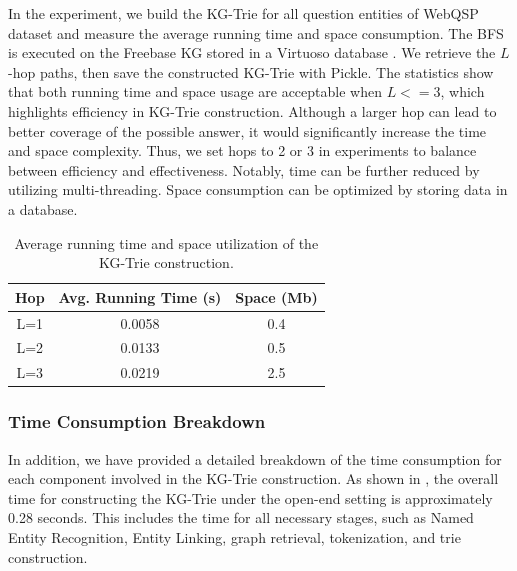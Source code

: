 {    In the experiment, we build the KG-Trie for all question entities of WebQSP dataset and measure the average running time and space consumption. The BFS is executed on the Freebase KG stored in a Virtuoso database \citep{erling2009rdf}. We retrieve the $L$-hop paths, then save the constructed KG-Trie with Pickle. The statistics show that both running time and space usage are acceptable when $L<=3$, which highlights efficiency in KG-Trie construction. 
    Although a larger hop can lead to better coverage of the possible answer, it would significantly increase the time and space complexity. Thus, we set hops to 2 or 3 in experiments to balance between efficiency and effectiveness. Notably, time can be further reduced by utilizing multi-threading. Space consumption can be optimized by storing data in a database.


    \begin{table}[]
        \centering
        \caption{Average running time and space utilization of the KG-Trie construction.}\label{tab:time_and_sapce}
        \begin{tabular}{@{}ccc@{}}
            \toprule
            Hop & Avg. Running Time (s) & Space (Mb) \\ \midrule
            L=1 & 0.0058                & 0.4        \\
            L=2 & 0.0133                & 0.5        \\
            L=3 & 0.0219               & 2.5        \\\bottomrule
        \end{tabular}%
    \end{table}

    \subsubsection{Time Consumption Breakdown}
    In addition, we have provided a detailed breakdown of the time consumption for each component involved in the KG-Trie construction. As shown in , the overall time for constructing the KG-Trie under the open-end setting is approximately 0.28 seconds. This includes the time for all necessary stages, such as Named Entity Recognition, Entity Linking, graph retrieval, tokenization, and trie construction.

}
